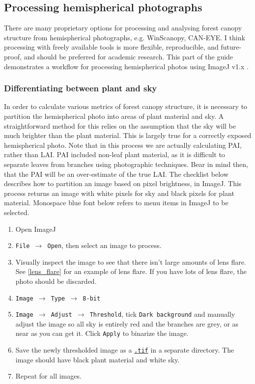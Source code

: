 \documentclass[11pt,a4paper]{article}
\newcommand\menu[1]{\texttt{\color{blue}#1}}  %
\newcommand\file[1]{\texttt{\underline{#1}}}  %
\begin{document}
\subsection{Processing hemispherical photographs}

There are many proprietary options for processing and analysing forest canopy structure from hemispherical photographs, e.g. WinScanopy, CAN-EYE. I think processing with freely available tools is more flexible, reproducible, and future-proof, and should be preferred for academic research. This part of the guide demonstrates a workflow for processing hemispherical photos using ImageJ v1.x \citep{Schneider2012}.

\subsubsection{Differentiating between plant and sky}

In order to calculate various metrics of forest canopy structure, it is necessary to partition the hemispherical photo into areas of plant material and sky. A straightforward method for this relies on the assumption that the sky will be much brighter than the plant material. This is largely true for a correctly exposed hemispherical photo. Note that in this process we are actually calculating PAI, rather than LAI. PAI included non-leaf plant material, as it is difficult to separate leaves from branches using photographic techniques. Bear in mind then, that the PAI will be an over-estimate of the true LAI. The checklist below describes how to partition an image based on pixel brightness, in ImageJ. This process returns an image with white pixels for sky and black pixels for plant material. Monospace blue font below refers to menu items in ImageJ to be selected.

\begin{enumerate}
	\item{Open ImageJ}
	\item{\menu{File $\rightarrow$ Open}, then select an image to process.}
	\item{Visually inspect the image to see that there isn't large amounts of lens flare. See \autoref{lens_flare} for an example of lens flare. If you have lots of lens flare, the photo should be discarded.}
	\item{\menu{Image $\rightarrow$ Type $\rightarrow$ 8-bit}}
	\item{\menu{Image $\rightarrow$ Adjust $\rightarrow$ Threshold}, tick \menu{Dark background} and manually adjust the image so all sky is entirely red and the branches are grey, or as near as you can get it. Click \menu{Apply} to binarize the image.}
	\item{Save the newly thresholded image as a \file{.tif} in a separate directory. The image should have black plant material and white sky.}
	\item{Repeat for all images.}
\end{enumerate}
\end{document}

